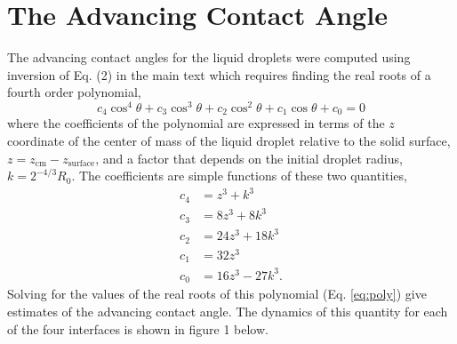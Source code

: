


\section{The Advancing Contact Angle}
The advancing contact angles for the liquid droplets were computed
using inversion of Eq. (2) in the main text which requires finding the
real roots of a fourth order polynomial,
\begin{equation}
\label{eq:poly}
c_4 \cos^4 \theta + c_3 \cos^3 \theta + c_2 \cos^2 \theta + c_1
\cos \theta + c_0 = 0
\end{equation}
where the coefficients of the polynomial are expressed in terms of the
$z$ coordinate of the center of mass of the liquid droplet relative to
the solid surface, $z = z_\mathrm{cm} - z_\mathrm{surface}$, and a
factor that depends on the initial droplet radius, $k = 2^{-4/3} R_0$.
The coefficients are simple functions of these two quantities,
\begin{align}
c_4 &= z^3 + k^3 \\
c_3 &= 8 z^3 + 8 k^3 \\
c_2 &= 24 z^3 + 18 k^3 \\
c_1 &= 32 z^3 \\
c_0 &= 16 z^3 - 27 k^3 .
\end{align}
Solving for the values of the real roots of this polynomial
(Eq. \ref{eq:poly}) give estimates of the advancing contact angle.
The dynamics of this quantity for each of the four interfaces is shown
in figure 1 below.

